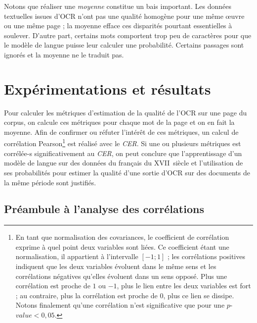 \documentclass[10pt,twoside]{article}
\begin{document}
	    Notons que réaliser une \textit{moyenne} constitue un bais important. Les données textuelles issues d'OCR n'ont pas une qualité homogène
	    pour une même \oe{}uvre ou une même page ; la moyenne efface ces disparités pourtant essentielles à soulever. D'autre
	    part, certains mots comportent trop peu de caractères pour que le modèle de langue puisse leur calculer une probabilité. Certains passages sont 
	    ignorés et la moyenne ne le traduit pas. 


\section{Expérimentations et résultats}\label{expe}

Pour calculer les métriques d'estimation de la qualité de l'OCR sur une page du corpus, on calcule ces métriques pour chaque mot de la page
et on en fait la moyenne. Afin de confirmer ou réfuter l'intérêt de ces métriques, un calcul de corrélation 
Pearson\footnote{En tant que normalisation des covariances, le coefficient de corrélation exprime à quel point deux variables 
sont liées. Ce coefficient étant une normalisation, il appartient à l'intervalle $\left[-1;1\right]$ ; les corrélations 
positives indiquent que les deux variables évoluent dans le même sens et les corrélations négatives qu'elles évoluent dans un sens opposé. 
Plus une corrélation est proche de $1$ ou $-1$, plus le lien entre les deux variables est fort ; au
contraire, plus la corrélation est proche de $0$, plus ce lien se dissipe. Notons finalement qu'une corrélation n'est 
significative que pour une $p$-$value < 0,05$.}  
est réalisé avec le \textit{CER}. Si une ou plusieurs métriques est corrélée-s significativement au \textit{CER}, on peut
conclure que l'apprentissage d'un modèle de langue sur des données du français du XVII\ieme~siècle et l'utilisation de ses 
probabilités pour estimer la qualité d'une sortie d'OCR sur des documents de la même période sont justifiés.

    \subsection{Préambule à l'analyse des corrélations}
    
\end{document}

